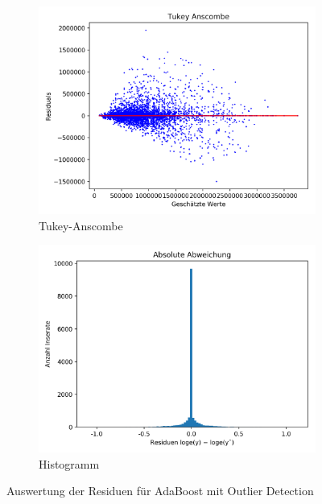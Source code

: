 \begin{figure}[h]
\begin{subfigure}{.5\textwidth}
  \centering
  \includegraphics[width=\linewidth]{images/adaboost_tukey_anscombe_6.png}
  \caption[Tukey-Anscombe]{Tukey-Anscombe}
  \label{fig:ada_tukey-anscombe_6}
\end{subfigure}
\begin{subfigure}{.5\textwidth}
  \centering
  \includegraphics[width=\linewidth]{images/adaboost_verteilung_residuals_log_6.png}
  \caption[Histogramm]{Histogramm}
  \label{fig:ada_histo_6}
\end{subfigure}
\caption[Auswertung der Residuen für AdaBoost mit Outlier Detection]{Auswertung der Residuen für AdaBoost  mit Outlier Detection}
\label{fig:adaboost_6}
\end{figure}


